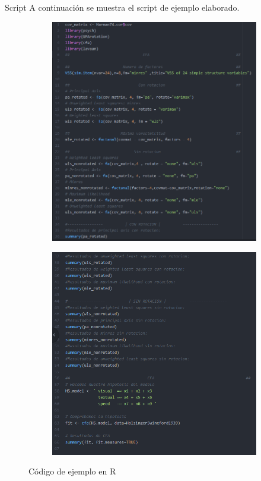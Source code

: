 \documentclass[10pt]{beamer}
\begin{document}
\begin{frame}[fragile]{Script}
	A continuación se muestra el script de ejemplo elaborado.
	\vspace{10px}
	\begin{figure}
		\centering
		\begin{subfigure}{0.49\textwidth}
			\centering
			\includegraphics[scale=0.287]{./Imagenes/codigo1.png}
		\end{subfigure}
		\begin{subfigure}{0.49\textwidth}
			\centering
			\includegraphics[scale=0.33]{./Imagenes/codigo2.png}
		\end{subfigure}
	\caption{Código de ejemplo en R}
	\end{figure}
\end{frame}
\end{document}
